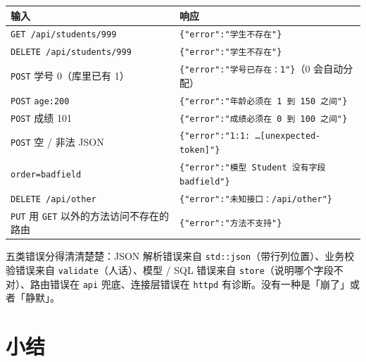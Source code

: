 \begin{center}
\begin{tabular}{ll}
\toprule
输入 & 响应 \\
\midrule
\texttt{GET /\allowbreak{}api/\allowbreak{}students/\allowbreak{}999} & \texttt{\{"error":\allowbreak{}"学生不存在"\}} \\
\texttt{DELETE /\allowbreak{}api/\allowbreak{}students/\allowbreak{}999} & \texttt{\{"error":\allowbreak{}"学生不存在"\}} \\
\texttt{POST} 学号 0（库里已有 1） & \texttt{\{"error":\allowbreak{}"学号已存在：1"\}}（0 会自动分配） \\
\texttt{POST} \texttt{age:\allowbreak{}200} & \texttt{\{"error":\allowbreak{}"年龄必须在 1 到 150 之间"\}} \\
\texttt{POST} 成绩 101 & \texttt{\{"error":\allowbreak{}"成绩必须在 0 到 100 之间"\}} \\
\texttt{POST} 空 / 非法 JSON & \texttt{\{"error":\allowbreak{}"1:\allowbreak{}1:\allowbreak{} …[\allowbreak{}unexpected-token]\allowbreak{}"\}} \\
\texttt{order=\allowbreak{}badfield} & \texttt{\{"error":\allowbreak{}"模型 Student 没有字段 badfield"\}} \\
\texttt{DELETE /\allowbreak{}api/\allowbreak{}other} & \texttt{\{"error":\allowbreak{}"未知接口：/\allowbreak{}api/\allowbreak{}other"\}} \\
\texttt{PUT} 用 \texttt{GET} 以外的方法访问不存在的路由 & \texttt{\{"error":\allowbreak{}"方法不支持"\}} \\
\bottomrule
\end{tabular}
\end{center}

五类错误分得清清楚楚：JSON 解析错误来自 \texttt{std:\allowbreak{}:\allowbreak{}json}（带行列位置）、业务校验错误来自 \texttt{validate}（人话）、模型 / SQL 错误来自 \texttt{store}（说明哪个字段不对）、路由错误在 \texttt{api} 兜底、连接层错误在 \texttt{httpd} 有诊断。没有一种是「崩了」或者「静默」。

\section{小结}

